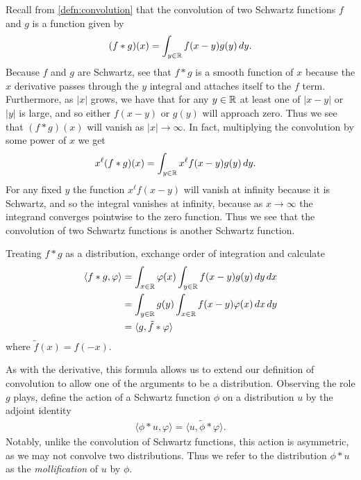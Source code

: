     Recall from \cref{defn:convolution} that the convolution of two Schwartz functions $f$ and $g$ is a function given by
    \begin{align*}
      (f*g)(x) = \int_{y\in\mathbb{R}} f(x-y)g(y)\,dy \text{.}
    \end{align*}
    Because $f$ and $g$ are Schwartz, see that $f*g$ is a smooth function of $x$ because the $x$ derivative passes through the $y$ integral and attaches itself to the $f$ term.
    Furthermore, as $|x|$ grows, we have that for any $y\in\mathbb{R}$ at least one of $|x-y|$ or $|y|$ is large, and so either $f(x-y)$ or $g(y)$ will approach zero.
    Thus we see that $(f*g)(x)$ will vanish as $|x|\rightarrow\infty$.
    In fact, multiplying the convolution by some power of $x$ we get
    \begin{align*}
      x^\ell(f*g)(x)
      &= \int_{y\in\mathbb{R}} x^\ell f(x-y)g(y)\,dy \text{.}
    \end{align*}
    For any fixed $y$ the function $x^\ell f(x-y)$ will vanish at infinity because it is Schwartz, and so the integral vanishes at infinity, because as $x\rightarrow\infty$ the integrand converges pointwise to the zero function.
    Thus we see that the convolution of two Schwartz functions is another Schwartz function.

    Treating $f*g$ as a distribution, exchange order of integration and calculate
    \begin{align*}
      \langle f*g,\varphi\rangle
      &= \int_{x\in\mathbb{R}} \varphi(x) \int_{y\in\mathbb{R}} f(x-y)g(y)\,dy\,dx
      \\&= \int_{y\in\mathbb{R}} g(y) \int_{x\in\mathbb{R}} f(x-y)\varphi(x)\,dx\,dy
      \\&= \langle g, \tilde f*\varphi\rangle
    \end{align*}
    where $\tilde f(x) = f(-x)$.

    As with the derivative, this formula allows us to extend our definition of convolution to allow one of the arguments to be a distribution.
    Observing the role $g$ plays, define the action of a Schwartz function $\phi$ on a distribution $u$ by the adjoint identity
    \begin{align*}
      \langle \phi*u, \varphi\rangle
      = \langle u, \tilde\phi*\varphi\rangle \text{.}
    \end{align*}
    Notably, unlike the convolution of Schwartz functions, this action is asymmetric, as we may not convolve two distributions.
    Thus we refer to the distribution $\phi*u$ as the \emph{mollification} of $u$ by $\phi$.

